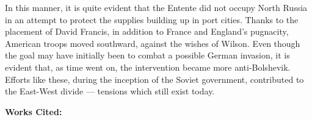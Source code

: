 \begin{justify}
  \hspace{.5in} In this manner, it is quite evident that the Entente did not occupy North Russia in an attempt to protect the supplies building up in port cities. Thanks to the placement of David Francis, in addition to France and England's pugnacity, American troops moved southward, against the wishes of Wilson. Even though the goal may have initially been to combat a possible German invasion, it is evident that, as time went on, the intervention became more anti-Bolshevik. Efforts like these, during the inception of the Soviet government, contributed to the East-West divide — tensions which still exist today.

\end{justify}

\newpage

\begin{center}
  
  \textbf{Works Cited:}

\end{center}

\singlespacing


